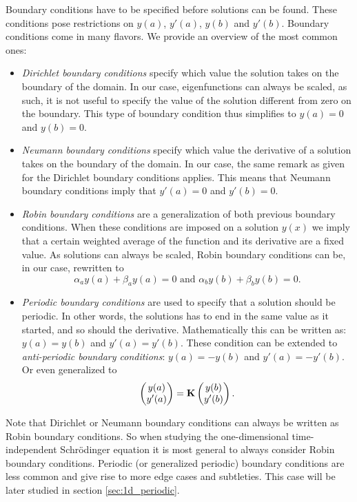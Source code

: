 Boundary conditions have to be specified before solutions can be found. These conditions pose restrictions on $y(a)$, $y'(a)$, $y(b)$ and $y'(b)$. Boundary conditions come in many flavors. We provide an overview of the most common ones:
\begin{itemize}
    \item \emph{Dirichlet boundary conditions} specify which value the solution takes on the boundary of the domain. In our case, eigenfunctions can always be scaled, as such, it is not useful to specify the value of the solution different from zero on the boundary. This type of boundary condition thus simplifies to $y(a) = 0$ and $y(b) = 0$.
    \item \emph{Neumann boundary conditions} specify which value the derivative of a solution takes on the boundary of the domain. In our case, the same remark as given for the Dirichlet boundary conditions applies. This means that Neumann boundary conditions imply that $y'(a) = 0$ and $y'(b) = 0$.
    \item \emph{Robin boundary conditions} are a generalization of both previous boundary conditions. When these conditions are imposed on a solution $y(x)$ we imply that a certain weighted average of the function and its derivative are a fixed value. As solutions can always be scaled, Robin boundary conditions can be, in our case, rewritten to
          $$
              \alpha_a y(a) + \beta_a y(a) = 0 \text{ and } \alpha_b y(b) + \beta_b y(b) = 0  \text{.}
          $$
    \item \emph{Periodic boundary conditions} are used to specify that a solution should be periodic. In other words, the solutions has to end in the same value as it started, and so should the derivative. Mathematically this can be written as: $y(a) = y(b)$ and $y'(a) = y'(b)$. These condition can be extended to \emph{anti-periodic boundary conditions}: $y(a) = -y(b)$ and $y'(a) = -y'(b)$. Or even generalized to
          $$
              \begin{pmatrix} y(a) \\ y'(a) \end{pmatrix} = \vb{K} \begin{pmatrix} y(b) \\ y'(b) \end{pmatrix}\text{.}
          $$
\end{itemize}

Note that Dirichlet or Neumann boundary conditions can always be written as Robin boundary conditions. So when studying the one-dimensional time-independent Schrödinger equation it is most general to always consider Robin boundary conditions. Periodic (or generalized periodic) boundary conditions are less common and give rise to more edge cases and subtleties. This case will be later studied in section \ref{sec:1d_periodic}.


